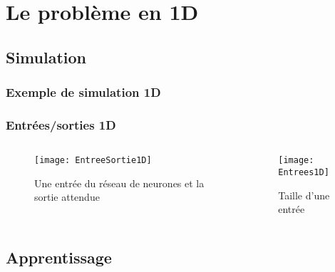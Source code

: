 

% 

\section{Le problème en 1D}

\subsection{Simulation}

\begin{frame}[fragile]
    \frametitle{Exemple de simulation 1D}
  \begin{center}
  \end{center}
\end{frame}

\begin{frame}[fragile]
    \frametitle{Entrées/sorties 1D}

    \begin{columns}
    \begin{column}{0.7\textwidth}
        \begin{figure}
        \texttt{[image: EntreeSortie1D]}       
        \caption{Une entrée du réseau de neurones et la sortie attendue}
        \end{figure}
     \end{column}
     \begin{column}{0.3\textwidth}
        \begin{figure}
        \texttt{[image: Entrees1D]}       
        \caption{Taille d'une entrée}
        \end{figure}
     \end{column}
    \end{columns}

\end{frame}

\subsection{Apprentissage}

